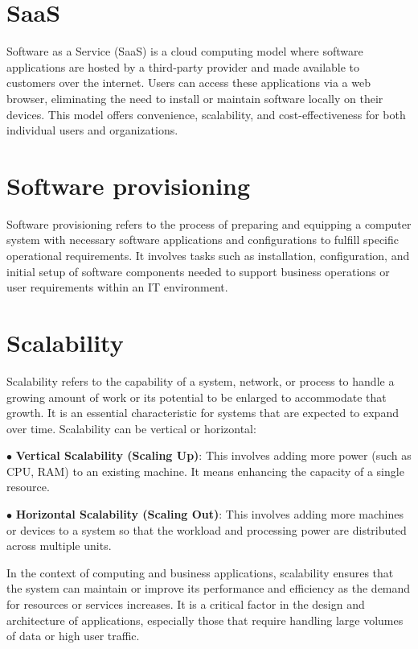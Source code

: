 \section{SaaS}
Software as a Service (SaaS) is a cloud computing model where software applications are hosted by a third-party provider and made available to customers over the internet. Users can access these applications via a web browser, eliminating the need to install or maintain software locally on their devices. This model offers convenience, scalability, and cost-effectiveness for both individual users and organizations.

\section{Software provisioning}
Software provisioning refers to the process of preparing and equipping a computer system with necessary software applications and configurations to fulfill specific operational requirements. It involves tasks such as installation, configuration, and initial setup of software components needed to support business operations or user requirements within an IT environment.


\section{Scalability}
Scalability refers to the capability of a system, network,
or process to handle a growing amount of work or its potential to be enlarged
to accommodate that growth. It is an essential characteristic for systems that are expected to expand over time.
Scalability can be vertical or horizontal:

$\bullet$ \textbf{Vertical Scalability (Scaling Up)}: This involves adding more power (such as CPU, RAM) to an existing machine. It means enhancing the capacity of a single resource.

$\bullet$ \textbf{Horizontal Scalability (Scaling Out)}: This involves adding more machines or devices to a system so that the workload and processing power are distributed across multiple units.

In the context of computing and business applications, scalability ensures that the system can maintain or improve its performance and efficiency as the demand for resources or services increases. It is a critical factor in the design and architecture of applications, especially those that require handling large volumes of data or high user traffic.

